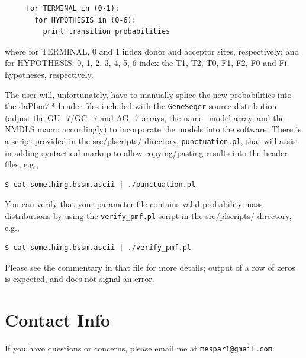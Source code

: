 \documentclass[11pt]{article}
\begin{document}
\begin{enumerate}
  \begin{verbatim}
     for TERMINAL in (0-1):
       for HYPOTHESIS in (0-6):
         print transition probabilities
  \end{verbatim}

  where for TERMINAL, 0 and 1 index donor and acceptor sites,
  respectively; and for HYPOTHESIS, 0, 1, 2, 3, 4, 5, 6 index the T1,
  T2, T0, F1, F2, F0 and Fi hypotheses, respectively.

  The user will, unfortunately, have to manually splice the new probabilities
  into the daPbm7.* header files included with the \texttt{GeneSeqer} source
  distribution (adjust the GU\_7/GC\_7 and AG\_7 arrays, the name\_model
  array, and the NMDLS macro accordingly) to incorporate the models
  into the software.  There is a script provided in the src/plscripts/ directory,
  \texttt{punctuation.pl}, that will assist in adding syntactical markup
  to allow copying/pasting results into the header files, e.g.,

  \begin{verbatim}
$ cat something.bssm.ascii | ./punctuation.pl
  \end{verbatim}
  You can verify that your parameter file contains valid probability
  mass distributions by using the \texttt{verify\_pmf.pl} script
  in the src/plscripts/ directory, e.g.,

  \begin{verbatim}
$ cat something.bssm.ascii | ./verify_pmf.pl
  \end{verbatim}
  Please see the commentary in that file for more details;
  output of a row of zeros is expected, and does not signal
  an error.
\end{enumerate}

\section{Contact Info}
If you have questions or concerns,
please email me at \texttt{mespar1@gmail.com}.
\end{document}
